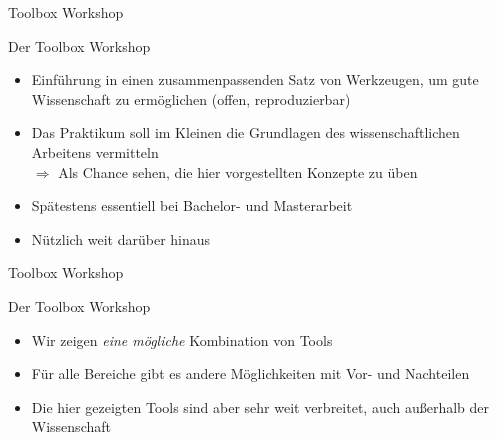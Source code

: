 \begin{frame}{Toolbox Workshop}
    \begin{center}
        \textcolor{vertexDarkRed}{\Huge Der Toolbox Workshop}\\[\baselineskip]
        \begin{itemize}
            \item Einführung in einen zusammenpassenden Satz von Werkzeugen,
                um gute Wissenschaft zu ermöglichen (offen, reproduzierbar)
            \item Das Praktikum soll im Kleinen die Grundlagen des wissenschaftlichen Arbeitens vermitteln \\
                $\Rightarrow$ Als Chance sehen, die hier vorgestellten Konzepte zu üben
            \item Spätestens essentiell bei Bachelor- und Masterarbeit
            \item Nützlich weit darüber hinaus
        \end{itemize}
    \end{center}
\end{frame}

\begin{frame}{Toolbox Workshop}
    \begin{center}
        \textcolor{vertexDarkRed}{\Huge Der Toolbox Workshop}\\[\baselineskip]
        \begin{itemize}
            \item Wir zeigen \emph{eine mögliche} Kombination von Tools
            \item Für alle Bereiche gibt es andere Möglichkeiten mit Vor- und Nachteilen
            \item Die hier gezeigten Tools sind aber sehr weit verbreitet, auch außerhalb der Wissenschaft
        \end{itemize}
    \end{center}
\end{frame}
